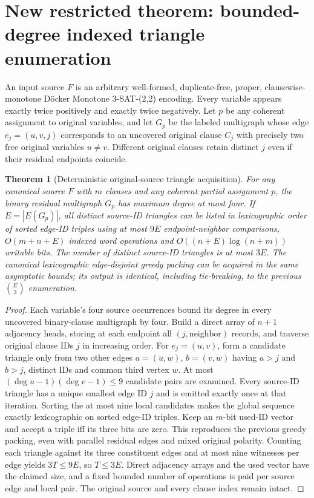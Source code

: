 \documentclass[11pt]{article}
\newtheorem{theorem}{Theorem}
\begin{document}
\section{New restricted theorem: bounded-degree indexed triangle enumeration}
An input source $F$ is an arbitrary well-formed, duplicate-free, proper, clausewise-monotone D\"ocker Monotone 3-SAT-(2,2) encoding. Every variable appears exactly twice positively and exactly twice negatively. Let $p$ be any coherent assignment to original variables, and let $G_p$ be the labeled multigraph whose edge $e_j=(u,v,j)$ corresponds to an uncovered original clause $C_j$ with precisely two free original variables $u\ne v$. Different original clauses retain distinct $j$ even if their residual endpoints coincide.
\begin{theorem}[Deterministic original-source triangle acquisition]
For any canonical source $F$ with $m$ clauses and any coherent partial assignment $p$, the binary residual multigraph $G_p$ has maximum degree at most four. If $E=|E(G_p)|$, all distinct source-ID triangles can be listed in lexicographic order of sorted edge-ID triples using at most $9E$ endpoint-neighbor comparisons, $O(m+n+E)$ indexed word operations and $O((n+E)\log(n+m))$ writable bits. The number of distinct source-ID triangles is at most $3E$. The canonical lexicographic edge-disjoint greedy packing can be acquired in the same asymptotic bounds; its output is \emph{identical}, including tie-breaking, to the previous $\binom E3$ enumeration.
\end{theorem}
\begin{proof}
Each variable's four source occurrences bound its degree in every uncovered binary-clause multigraph by four. Build a direct array of $n+1$ adjacency heads, storing at each endpoint all $(j,\text{neighbor})$ records, and traverse original clause IDs $j$ in increasing order. For $e_j=(u,v)$, form a candidate triangle only from two other edges $a=(u,w)$, $b=(v,w)$ having $a>j$ and $b>j$, distinct IDs and common third vertex $w$. At most $(\deg u-1)(\deg v-1)\le9$ candidate pairs are examined. Every source-ID triangle has a unique smallest edge ID $j$ and is emitted exactly once at that iteration. Sorting the at most nine local candidates makes the global sequence exactly lexicographic on sorted edge-ID triples. Keep an $m$-bit used-ID vector and accept a triple iff its three bits are zero. This reproduces the previous greedy packing, even with parallel residual edges and mixed original polarity. Counting each triangle against its three constituent edges and at most nine witnesses per edge yields $3T\le9E$, so $T\le3E$. Direct adjacency arrays and the used vector have the claimed size, and a fixed bounded number of operations is paid per source edge and local pair. The original source and every clause index remain intact.\end{proof}
\end{document}
